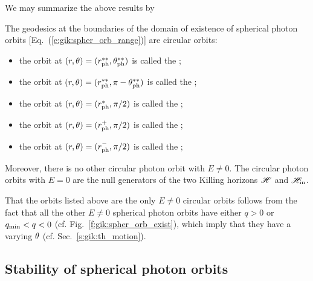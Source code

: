 We may summarize the above results by
\begin{greybox}
The geodesics at the boundaries of the domain of
existence of spherical photon orbits [Eq.~(\ref{e:gik:spher_orb_range})] are circular orbits:
\begin{itemize}
\item the orbit at $(r,\theta)=(r_{\rm ph}^{**},\theta_{\rm ph}^{**})$ is called
the ;
\item the orbit at $(r,\theta)=(r_{\rm ph}^{**},\pi - \theta_{\rm ph}^{**})$ is called
the ;
\item the orbit at $(r,\theta)=(r_{\rm ph}^*,\pi/2)$ is called the ;
\item the orbit at $(r,\theta)=(r_{\rm ph}^+,\pi/2)$ is called the ;
\item the orbit at $(r,\theta)=(r_{\rm ph}^-,\pi/2)$ is called the ;
\end{itemize}
Moreover, there is no other circular photon orbit with $E\neq 0$. The circular photon orbits
with $E=0$ are the null generators of the two Killing horizons $\mathscr{H}$ and $\mathscr{H}_{\rm in}$.
\end{greybox}
That the orbits listed above are the only $E\neq 0$ circular orbits follows from the fact
that all the other $E\neq 0$ spherical photon orbits have either $q > 0$ or $q_{\rm min} < q < 0$
(cf. Fig.~\ref{f:gik:spher_orb_exist}), which imply that they have a varying $\theta$
(cf. Sec.~\ref{s:gik:th_motion}).

\subsection{Stability of spherical photon orbits} \label{s:gik:spher_stability}

